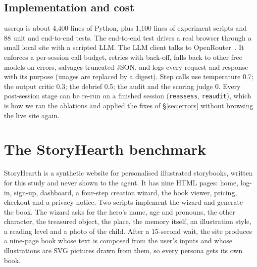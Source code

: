 \documentclass[10pt,twocolumn]{article}
\newcommand{\sys}{\textsf{userqa}}
\newcommand{\site}{StoryHearth}
\begin{document}
\subsection{Implementation and cost}
\label{sec:impl}

\sys{} is about 4,400 lines of Python, plus 1,100 lines of experiment scripts and 88 unit and end-to-end tests. The end-to-end test drives a real browser through a small local site with a scripted LLM. The LLM client talks to OpenRouter~\cite{openrouter}. It enforces a per-session call budget, retries with back-off, falls back to other free models on errors, salvages truncated JSON, and logs every request and response with its purpose (images are replaced by a digest). Step calls use temperature 0.7; the output critic 0.3; the debrief 0.5; the audit and the scoring judge 0. Every post-session stage can be re-run on a finished session (\texttt{reassess}, \texttt{reaudit}), which is how we ran the ablations and applied the fixes of \S\ref{sec:errors} without browsing the live site again.

\section{The StoryHearth benchmark}
\label{sec:benchmark}

\site{} is a synthetic website for personalised illustrated storybooks, written for this study and never shown to the agent. It has nine HTML pages: home, log-in, sign-up, dashboard, a four-step creation wizard, the book viewer, pricing, checkout and a privacy notice. Two scripts implement the wizard and generate the book. The wizard asks for the hero's name, age and pronouns, the other character, the treasured object, the place, the memory itself, an illustration style, a reading level and a photo of the child. After a 15-second wait, the site produces a nine-page book whose text is composed from the user's inputs and whose illustrations are SVG pictures drawn from them, so every persona gets its own book.
\end{document}
